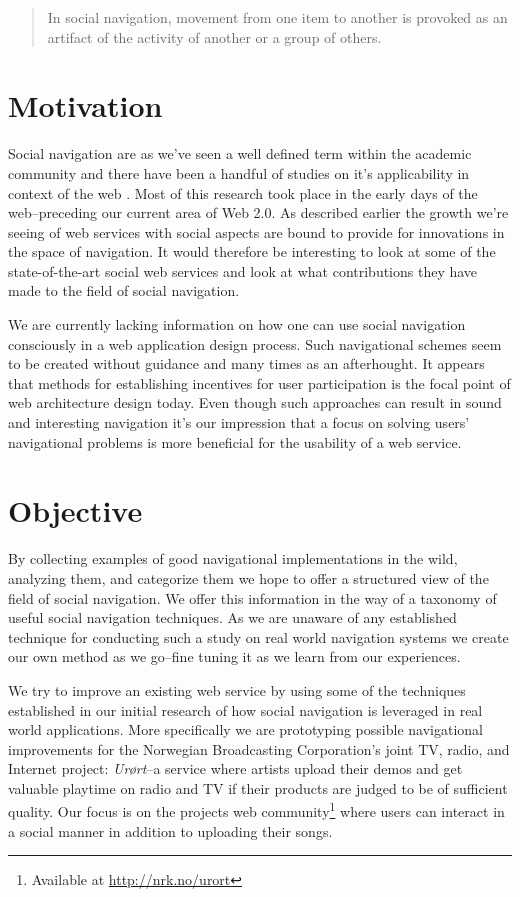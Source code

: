 \begin{quote}
In social navigation, movement from one item to another is provoked as an
artifact of the activity of another or a group of others. \citep{dourish94} 
\end{quote}

\section{Motivation}

Social navigation are as we've seen a well defined term within the academic
community and there have been a handful of studies on it's applicability in
context of the web \citep{dieberger97,wexelblat99}. %
Most of this research took place in the early days of the
web--preceding our current area of Web 2.0. As described earlier the
growth we're seeing of web services with social aspects are bound to provide
for innovations in the space of navigation. It would therefore be interesting
to look at some of the state-of-the-art social web services and look at what
contributions they have made to the field of social navigation.

We are currently lacking information on how one can use social navigation
consciously in a web application design process. Such navigational schemes
seem to be created without guidance and many times as an afterhought.
It appears that methods for establishing incentives for user participation
is the focal point of web architecture design today. Even though such
approaches can result in sound and interesting navigation it's our impression
that a focus on solving users' navigational problems is more beneficial for
the usability of a web service.

\section{Objective}

By collecting examples of good navigational implementations in the wild,
analyzing them, and categorize them we hope to offer a structured view of the
field of social navigation. We offer this information in the way of a taxonomy
of useful social navigation techniques.
As we are unaware of any established technique for
conducting such a study on real world navigation systems we create our own
method as we go--fine tuning it as we learn from our experiences.

We try to improve an existing web service by using some of the techniques
established in our initial research of how social navigation is leveraged
in real world applications. More specifically we are prototyping possible
navigational improvements for the Norwegian Broadcasting Corporation's joint
TV, radio, and Internet project: \emph{Ur\o{}rt}--a service where artists upload
their demos and get valuable playtime on radio and TV if their products are
judged to be of sufficient quality. Our focus is on the projects
web community\footnote{Available at \url{http://nrk.no/urort}} where users can
interact in a social manner in addition to uploading their songs.

